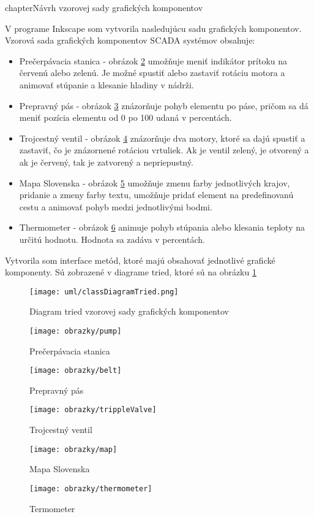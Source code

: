 chapter{Návrh vzorovej sady grafických komponentov}

V programe Inkscape som vytvorila nasledujúcu sadu grafických komponentov. Vzorová sada grafických komponentov SCADA systémov obsahuje:
\begin{itemize}
	\item Prečerpávacia stanica - obrázok \ref{fig:pump} umožňuje meniť indikátor prítoku na červenú alebo zelenú. Je možné spustiť alebo zastaviť rotáciu motora a animovať stúpanie a klesanie hladiny v nádrži. 
	\item Prepravný pás - obrázok \ref{fig:belt} znázorňuje pohyb elementu po páse, pričom sa dá meniť pozícia elementu od 0 po 100 udaná v percentách. 
	\item Trojcestný ventil - obrázok \ref{fig:trippleValve} znázorňuje dva motory, ktoré sa dajú spustiť a zastaviť, čo je znázornené rotáciou vrtuliek. Ak je ventil zelený, je otvorený a ak je červený, tak je zatvorený a nepriepustný.   
	\item Mapa Slovenska - obrázok \ref{fig:map} umožňuje zmenu farby jednotlivých krajov, pridanie a zmeny farby textu, umožňuje pridať element na predefinovanú cestu a animovať pohyb medzi jednotlivými bodmi. 
	\item Thermometer - obrázok \ref{fig:thermometer} animuje pohyb stúpania alebo klesania teploty na určitú hodnotu. Hodnota sa zadáva v percentách. 
\end{itemize}

Vytvorila som interface metód, ktoré majú obsahovať jednotlivé grafické komponenty. Sú zobrazené v diagrame tried, ktoré sú na obrázku \ref{fig:classD}


\begin{figure}[hp]
	\centering
	\texttt{[image: uml/classDiagramTried.png]}
	\caption{Diagram tried vzorovej sady grafických komponentov}
	\label{fig:classD}
\end{figure}


\begin{figure}[H]
	\centering
	\texttt{[image: obrazky/pump]}
	\caption{Prečerpávacia stanica}
	\label{fig:pump}
\end{figure}
\begin{figure}[H]
	\centering
	\texttt{[image: obrazky/belt]}
	\caption{Prepravný pás}
	\label{fig:belt}
\end{figure}
\begin{figure}[H]
	\centering
	\texttt{[image: obrazky/trippleValve]}
	\caption{Trojcestný ventil}
	\label{fig:trippleValve}
\end{figure}
\begin{figure}[H]
	\centering
	\texttt{[image: obrazky/map]}
	\caption{Mapa Slovenska}
	\label{fig:map}
\end{figure}
\begin{figure}[H]
	\centering
	\texttt{[image: obrazky/thermometer]}
	\caption{Termometer}
	\label{fig:thermometer}
\end{figure}